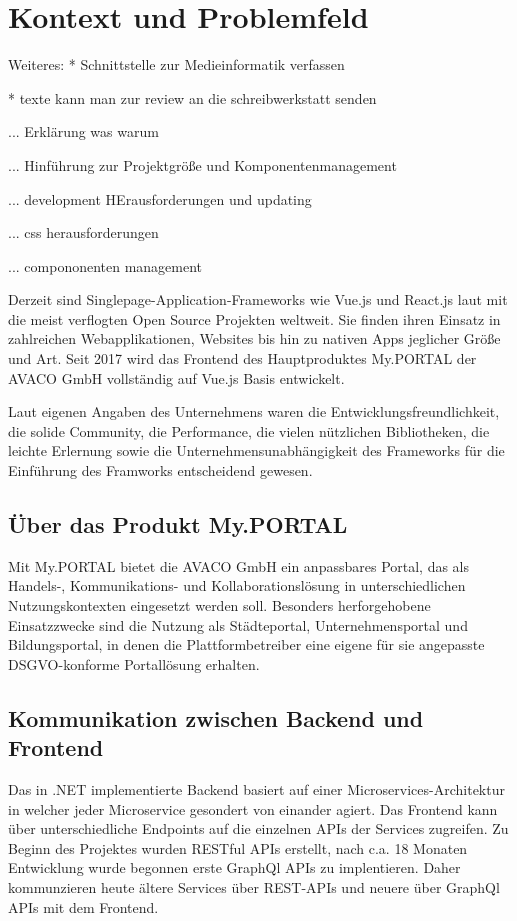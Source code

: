 \chapter{Kontext und Problemfeld}
\label{cha:Problemfeld und Kontext}

Weiteres:
* Schnittstelle zur Medieinformatik verfassen

* texte kann man zur review an die schreibwerkstatt senden

... Erklärung was  warum

... Hinführung zur Projektgröße und Komponentenmanagement

... development HErausforderungen und updating

... css herausforderungen

... compononenten management

Derzeit sind Singlepage-Application-Frameworks wie Vue.js und React.js laut \citeauthor{GithubStarSearch} mit die meist verflogten Open Source Projekten weltweit. Sie finden ihren Einsatz in zahlreichen Webapplikationen, Websites bis hin zu nativen Apps jeglicher Größe und Art. Seit 2017 wird das Frontend des Hauptproduktes My.PORTAL der AVACO GmbH vollständig auf Vue.js Basis entwickelt.

Laut eigenen Angaben des Unternehmens waren die Entwicklungsfreundlichkeit, die solide Community, die Performance, die vielen nützlichen Bibliotheken, die leichte Erlernung sowie die Unternehmensunabhängigkeit des Frameworks für die Einführung des Framworks entscheidend gewesen.

\section{Über das Produkt My.PORTAL}
Mit My.PORTAL bietet die AVACO GmbH ein anpassbares Portal, das als Handels-,
Kommunikations- und Kollaborationslösung in unterschiedlichen Nutzungskontexten eingesetzt werden soll. Besonders herforgehobene Einsatzzwecke sind die Nutzung als Städteportal, Unternehmensportal und Bildungsportal, in denen die Plattformbetreiber eine eigene für sie angepasste DSGVO-konforme Portallösung erhalten.

\section{Kommunikation zwischen Backend und Frontend}
Das in .NET implementierte Backend basiert auf einer Microservices-Architektur in welcher jeder Microservice gesondert von einander agiert. Das Frontend kann über unterschiedliche Endpoints auf die einzelnen APIs der Services zugreifen. Zu Beginn des Projektes wurden RESTful APIs erstellt, nach c.a. 18 Monaten Entwicklung wurde begonnen erste GraphQl APIs zu implentieren. Daher kommunzieren heute ältere Services über REST-APIs und neuere über GraphQl APIs mit dem Frontend.

